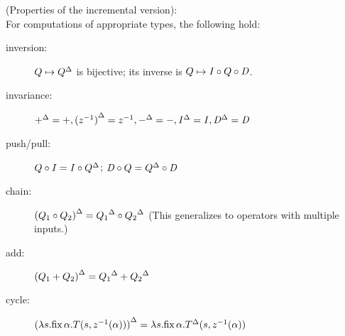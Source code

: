 \begin{proposition}(Properties of the incremental version):\\
\label{prop-inc-properties}
For computations of appropriate types, the following hold:
\begin{description}
\item[inversion:] $Q\mapsto{Q}^{\Delta}$ is bijective; its inverse is $Q\mapsto \mathit{I}\circ Q\circ\mathit{D}$.
\item[invariance:] ${+}^{\Delta} = +, {(z^{-1})}^{\Delta} = z^{-1}, {-}^{\Delta} = -, {\mathit{I}}^{\Delta}=\mathit{I}, {\mathit{D}}^{\Delta}=\mathit{D}$
\item[push/pull:] 
    $Q \circ \mathit{I} = \mathit{I} \circ {Q}^{\Delta}$; $\mathit{D}\circ Q = {Q}^{\Delta}\circ\mathit{D}$
\item[chain:] ${(Q_1\circ Q_2)}^{\Delta} = {Q_1}^{\Delta}\circ{Q_2}^{\Delta}$ (This generalizes to operators with multiple inputs.)
\item[add:] ${(Q_1 + Q_2)}^{\Delta} = {Q_1}^{\Delta} + {Q_2}^{\Delta}$
\item[cycle:] ${(\lambda s. \mbox{fix}\,\alpha.T(s,z^{-1}(\alpha)))}^{\Delta} = \lambda s. \mbox{fix}\,\alpha.{T}^{\Delta}(s,z^{-1}(\alpha))$
\end{description}
\end{proposition}
